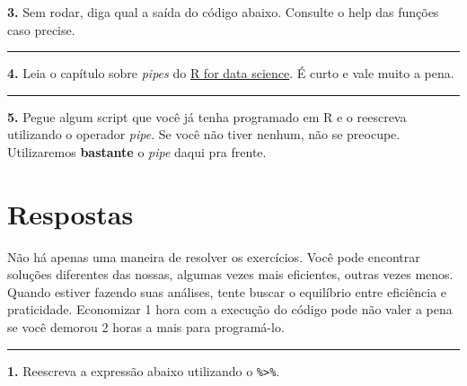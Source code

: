 \documentclass[
]{book}
\newenvironment{Shaded}{\begin{snugshade}}{\end{snugshade}}
\newcommand{\DataTypeTok}[1]{\textcolor[rgb]{0.13,0.29,0.53}{#1}}
\newcommand{\DecValTok}[1]{\textcolor[rgb]{0.00,0.00,0.81}{#1}}
\newcommand{\KeywordTok}[1]{\textcolor[rgb]{0.13,0.29,0.53}{\textbf{#1}}}
\newcommand{\NormalTok}[1]{#1}
\newcommand{\OperatorTok}[1]{\textcolor[rgb]{0.81,0.36,0.00}{\textbf{#1}}}
\newcommand{\OtherTok}[1]{\textcolor[rgb]{0.56,0.35,0.01}{#1}}
\newcommand{\StringTok}[1]{\textcolor[rgb]{0.31,0.60,0.02}{#1}}
\begin{document}
\textbf{3.} Sem rodar, diga qual a saída do código abaixo. Consulte o help das funções caso precise.

\begin{Shaded}
\end{Shaded}

\begin{center}\rule{0.5\linewidth}{0.5pt}\end{center}

\textbf{4.} Leia o capítulo sobre \emph{pipes} do \href{http://r4ds.had.co.nz/pipes.html}{R for data science}. É curto e vale muito a pena.

\begin{center}\rule{0.5\linewidth}{0.5pt}\end{center}

\textbf{5.} Pegue algum script que você já tenha programado em R e o reescreva utilizando o operador \emph{pipe}. Se você não tiver nenhum, não se preocupe. Utilizaremos \textbf{bastante} o \emph{pipe} daqui pra frente.

\hypertarget{respostas-1}{%
\section{Respostas}\label{respostas-1}}

Não há apenas uma maneira de resolver os exercícios. Você pode encontrar soluções diferentes das nossas, algumas vezes mais eficientes, outras vezes menos. Quando estiver fazendo suas análises, tente buscar o equilíbrio entre eficiência e praticidade. Economizar 1 hora com a execução do código pode não valer a pena se você demorou 2 horas a mais para programá-lo.

\begin{center}\rule{0.5\linewidth}{0.5pt}\end{center}

\textbf{1.} Reescreva a expressão abaixo utilizando o \texttt{\%\textgreater{}\%}.
\end{document}
